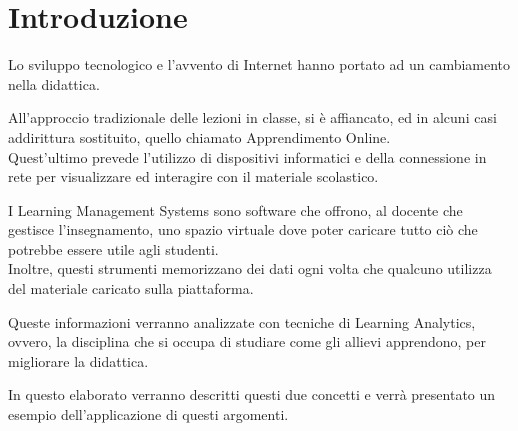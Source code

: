 \mainmatter

\chapter{Introduzione}

Lo sviluppo tecnologico e l'avvento di Internet hanno portato ad un cambiamento nella didattica.

All'approccio tradizionale delle lezioni in classe, si è affiancato, ed in alcuni casi addirittura sostituito, quello chiamato Apprendimento Online. \\
Quest'ultimo prevede l'utilizzo di dispositivi informatici e della connessione in rete per visualizzare ed interagire con il materiale scolastico.

I Learning Management Systems sono software che offrono, al docente che gestisce l'insegnamento, uno spazio virtuale dove poter caricare tutto ciò che potrebbe essere utile agli studenti. \\
Inoltre, questi strumenti memorizzano dei dati ogni volta che qualcuno utilizza del materiale caricato sulla piattaforma. 

Queste informazioni verranno analizzate con tecniche di Learning Analytics, ovvero, la disciplina che si occupa di studiare come gli allievi apprendono, per migliorare la didattica.

In questo elaborato verranno descritti questi due concetti e verrà presentato un esempio dell'applicazione di questi argomenti.
